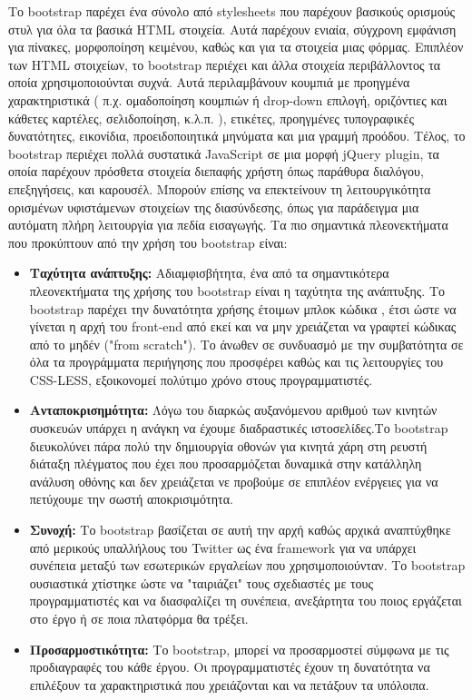 	Το bootstrap παρέχει ένα σύνολο από stylesheets που παρέχουν βασικούς ορισμούς στυλ για όλα τα βασικά HTML στοιχεία. Αυτά παρέχουν ενιαία, σύγχρονη εμφάνιση για πίνακες, μορφοποίηση κειμένου, καθώς και για τα στοιχεία μιας φόρμας. Επιπλέον των HTML στοιχείων, το bootstrap περιέχει και άλλα στοιχεία περιβάλλοντος τα οποία χρησιμοποιούνται συχνά. Αυτά περιλαμβάνουν κουμπιά με προηγμένα χαρακτηριστικά ( π.χ. ομαδοποίηση κουμπιών ή drop-down επιλογή, οριζόντιες και κάθετες καρτέλες, σελιδοποίηση, κ.λ.π. ), ετικέτες, προηγμένες τυπογραφικές δυνατότητες, εικονίδια, προειδοποιητικά μηνύματα και μια γραμμή προόδου. Τέλος, το bootstrap περιέχει πολλά συστατικά JavaScript σε μια μορφή jQuery plugin, τα οποία παρέχουν πρόσθετα στοιχεία διεπαφής χρήστη όπως παράθυρα διαλόγου, επεξηγήσεις, και καρουσέλ. Μπορούν επίσης να επεκτείνουν τη λειτουργικότητα ορισμένων υφιστάμενων στοιχείων της διασύνδεσης, όπως για παράδειγμα μια αυτόματη πλήρη λειτουργία για πεδία εισαγωγής\cite{bootstrap}. 
	Τα πιο σημαντικά πλεονεκτήματα που προκύπτουν από την χρήση του bootstrap είναι:
	\begin{itemize}
	\item \textbf{Ταχύτητα ανάπτυξης: } Αδιαμφισβήτητα, ένα από τα σημαντικότερα πλεονεκτήματα της χρήσης του bootstrap είναι η ταχύτητα της ανάπτυξης. Το bootstrap παρέχει την δυνατότητα χρήσης έτοιμων μπλοκ κώδικα , έτσι ώστε να γίνεται η αρχή του front-end από εκεί και να μην χρειάζεται να γραφτεί κώδικας  από το μηδέν ("from scratch"). Το άνωθεν σε συνδυασμό με την συμβατότητα σε όλα τα προγράμματα περιήγησης που προσφέρει καθώς και τις λειτουργίες του CSS-LESS, εξοικονομεί πολύτιμο χρόνο στους προγραμματιστές.
	\item \textbf{Ανταποκρισημότητα: } Λόγω του διαρκώς αυξανόμενου αριθμού των κινητών συσκευών υπάρχει η ανάγκη να έχουμε διαδραστικές ιστοσελίδες.Το bootstrap διευκολύνει πάρα πολύ την δημιουργία οθονών για κινητά χάρη στη ρευστή διάταξη πλέγματος που έχει που προσαρμόζεται δυναμικά στην κατάλληλη ανάλυση οθόνης και δεν χρειάζεται νε προβούμε σε επιπλέον ενέργειες για να πετύχουμε την σωστή αποκρισιμότητα.
	\item \textbf{Συνοχή: } Το bootstrap βασίζεται σε αυτή την αρχή καθώς αρχικά αναπτύχθηκε από μερικούς υπαλλήλους του Twitter ως ένα framework για να υπάρχει συνέπεια μεταξύ των εσωτερικών εργαλείων που χρησιμοποιούνταν. Το bootstrap ουσιαστικά χτίστηκε ώστε να "ταιριάζει" τους σχεδιαστές με τους προγραμματιστές και να διασφαλίζει τη συνέπεια, ανεξάρτητα του ποιος εργάζεται στο έργο ή σε ποια πλατφόρμα θα τρέξει.
	\item \textbf{Προσαρμοστικότητα: } Το bootstrap, μπορεί να προσαρμοστεί σύμφωνα με τις προδιαγραφές του κάθε έργου. Οι προγραμματιστές έχουν τη δυνατότητα να επιλέξουν τα χαρακτηριστικά που χρειάζονται και να πετάξουν τα υπόλοιπα.
	\end{itemize}

